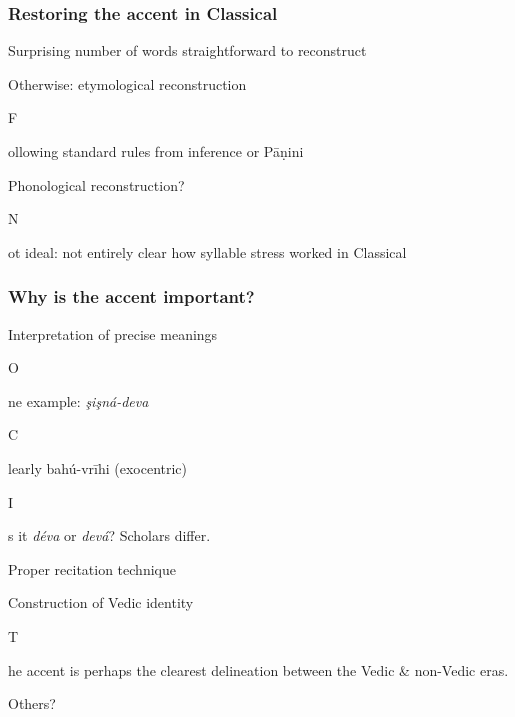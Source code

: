 \documentclass[pdf]{beamer}
\newcommand{\Subitem}[1]{{\setlength\itemindent{12pt} \item[-] #1}}
\begin{document}
\begin{frame} \frametitle{Restoring the accent in Classical}
\begin{itemize}
	\item Surprising number of words straightforward to reconstruct
	\item Otherwise: etymological reconstruction
	\Subitem Following standard rules from inference or Pāṇini
	\item Phonological reconstruction?
	\Subitem Not ideal: not entirely clear how syllable stress worked in Classical
\end{itemize}
\end{frame}

\begin{frame} \frametitle{Why is the accent important?}
\begin{itemize}
	\item Interpretation of precise meanings
	\Subitem One example: \textit{şişná-deva}
	\Subitem Clearly bahú-vrīhi (exocentric)
	\Subitem Is it \textit{déva} or \textit{devá}? Scholars differ.
	\item Proper recitation technique
	\item Construction of Vedic identity
	\Subitem The accent is perhaps the clearest delineation between the Vedic \& non-Vedic eras.
	\item Others?
\end{itemize}
\end{frame}

\end{document}
